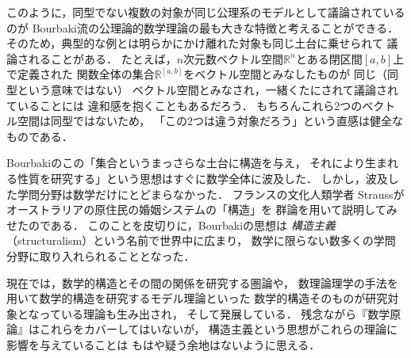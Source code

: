   このように，同型でない複数の対象が同じ公理系のモデルとして議論されているのが
  Bourbaki流の公理論的数学理論の最も大きな特徴と考えることができる．
  そのため，典型的な例とは明らかにかけ離れた対象も同じ土台に乗せられて
  議論されることがある．
  たとえば，$n$次元数ベクトル空間$\mathbb{R}^n$とある閉区間$[a,b]$上で定義された
  関数全体の集合$\mathbb{R} ^{[a,b]}$をベクトル空間とみなしたものが
  同じ（同型という意味ではない）
  ベクトル空間とみなされ，一緒くたにされて議論されていることには
  違和感を抱くこともあるだろう．
  もちろんこれら2つのベクトル空間は同型ではないため，
  「この2つは違う対象だろう」という直感は健全なものである．

  Bourbakiのこの「集合というまっさらな土台に構造を与え，
  それにより生まれる性質を研究する」という思想はすぐに数学全体に波及した．
  しかし，波及した学問分野は数学だけにとどまらなかった．
  フランスの文化人類学者
  Straussがオーストラリアの原住民の婚姻システムの「構造」を
  群論を用いて説明してみせたのである．
  このことを皮切りに，Bourbakiの思想は
  \emph{構造主義}（structuralism）という名前で世界中に広まり，
  数学に限らない数多くの学問分野に取り入れられることとなった．

  現在では，数学的構造とその間の関係を研究する圏論や，
  数理論理学の手法を用いて数学的構造を研究するモデル理論といった
  数学的構造そのものが研究対象となっている理論も生み出され，
  そして発展している．
  残念ながら『数学原論』はこれらをカバーしてはいないが，
  構造主義という思想がこれらの理論に影響を与えていることは
  もはや疑う余地はないように思える．





  


  

  

  


